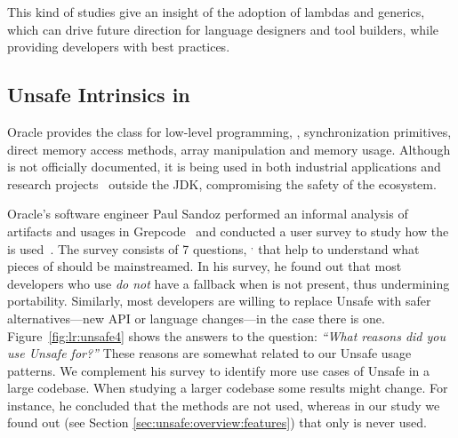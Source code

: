 This kind of studies give an insight of the adoption of lambdas and generics, which can drive future direction for language designers and tool builders, while providing developers with best practices.

\subsection{Unsafe Intrinsics in \java{}}
\label{sec:literature-review:unsafe}

Oracle provides the \smu{} class for low-level programming,
\eg{}, synchronization primitives, direct memory access methods,
array manipulation and memory usage.
Although \smu{} is not officially documented,
it is being used in both industrial applications
and research projects~\citep{korlandNoninvasiveConcurrencyJava2010,pukallFlexibleDynamicSoftware,gligoricCoDeSeFastDeserialization2011}
outside the JDK, compromising the safety of the \java{} ecosystem.

Oracle's software engineer Paul Sandoz performed an informal analysis of
\mavencentral{} artifacts and usages in Grepcode~\citep{sandoz-personal-communication}
and conducted a user survey to study how the \unsafe{} \api{} is used~\citep{psandoz14}.
The survey consists of 7 questions,%
%
\(^{,}\)%
that help to understand what pieces of \smu{} should be mainstreamed.
In his survey,
he found out that most developers who use \smu{} \emph{do not} have a fallback when \smu{} is not present,
thus undermining portability.
Similarly, most developers are willing to replace Unsafe with safer alternatives---new API or language changes---in the case there is one.
Figure~\ref{fig:lr:unsafe4} shows the answers to the question:
\emph{``What reasons did you use Unsafe for?''}
These reasons are somewhat related to our Unsafe usage patterns.
We complement his survey to identify more use cases of Unsafe in a large codebase.
When studying a larger codebase some results might change.
For instance, he concluded that the  methods are not used,
whereas in our study we found out (see Section \ref{sec:unsafe:overview:features})
that only  is never used.

